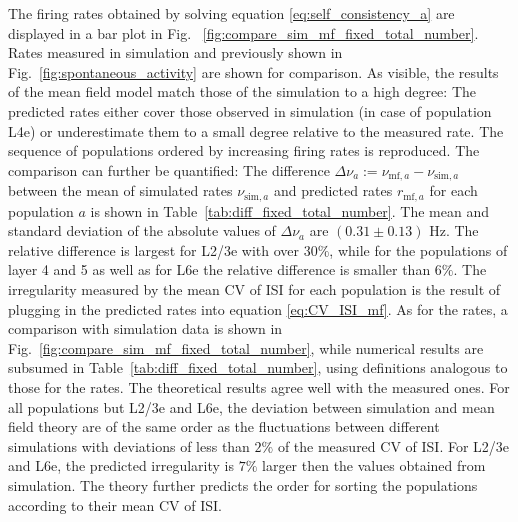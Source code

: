 The firing rates obtained by solving equation 
\eqref{eq:self_consistency_a} are displayed in a bar plot in Fig.%
~\ref{fig:compare_sim_mf_fixed_total_number}. Rates measured in 
simulation and previously shown in Fig.~\ref{fig:spontaneous_activity}
are shown for comparison. As visible, the results of the mean field model 
match those of the simulation to a high degree:
The predicted rates either cover those observed in simulation (in case of population
L4e) or underestimate them to a small degree relative to the measured rate. 
The sequence of populations ordered by increasing firing rates is reproduced.
The comparison can further be quantified: The difference 
$    \Delta \nu_a := \nu_{\text{mf}, a} - \nu_{\text{sim}, a} $
between the mean of simulated rates $\nu_{\text{sim}, a}$ and predicted rates 
$r_{\text{mf}, a}$ for each population $a$ is shown in Table~\ref{tab:diff_fixed_total_number}. 
The mean and standard 
deviation of the absolute values of $\Delta \nu_a$ 
are $(0.31 \pm  0.13)$ Hz. The relative difference
is largest for L2/3e with over $30 \%$, while for the populations 
of layer 4 and 5 as well as for L6e the relative difference is smaller 
than $6 \%$. 
The irregularity measured by the mean CV of ISI for each population is the result of 
plugging in the predicted rates into equation \eqref{eq:CV_ISI_mf}. 
As for the rates, a comparison with simulation data is shown
in Fig.~\ref{fig:compare_sim_mf_fixed_total_number}, 
while numerical results are subsumed in 
Table~\ref{tab:diff_fixed_total_number}, using definitions analogous to those for the rates.
The theoretical results agree well with the measured ones. 
For all populations but L2/3e and L6e, the 
deviation between simulation and mean field theory are of the same order as the fluctuations
between different simulations with deviations of less than $2 \%$ of the measured CV of ISI. 
For L2/3e and L6e, the predicted irregularity is $7 \%$ larger then the values obtained from simulation. 
The theory further predicts the order for sorting the populations according to their
mean CV of ISI. 

